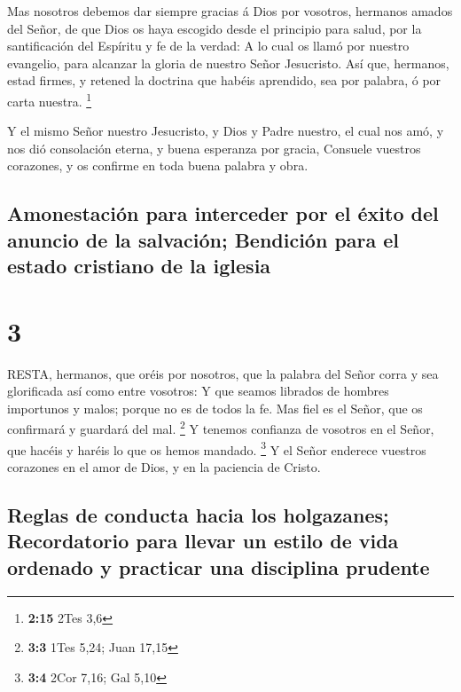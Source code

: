  Mas nosotros debemos dar siempre gracias á Dios por
vosotros, hermanos amados del Señor, de que Dios os haya escogido desde
el principio para salud, por la santificación del Espíritu y fe de la
verdad:  A lo cual os llamó por nuestro evangelio, para
alcanzar la gloria de nuestro Señor Jesucristo.  Así que,
hermanos, estad firmes, y retened la doctrina que habéis aprendido, sea
por palabra, ó por carta nuestra. \footnote{\textbf{2:15} 2Tes 3,6}

 Y el mismo Señor nuestro Jesucristo, y Dios y Padre
nuestro, el cual nos amó, y nos dió consolación eterna, y buena
esperanza por gracia,  Consuele vuestros corazones, y os
confirme en toda buena palabra y obra.

\hypertarget{amonestaciuxf3n-para-interceder-por-el-uxe9xito-del-anuncio-de-la-salvaciuxf3n-bendiciuxf3n-para-el-estado-cristiano-de-la-iglesia}{%
\subsection{Amonestación para interceder por el éxito del anuncio de la
salvación; Bendición para el estado cristiano de la
iglesia}\label{amonestaciuxf3n-para-interceder-por-el-uxe9xito-del-anuncio-de-la-salvaciuxf3n-bendiciuxf3n-para-el-estado-cristiano-de-la-iglesia}}

\hypertarget{section-2}{%
\section{3}\label{section-2}}

 RESTA, hermanos, que oréis por nosotros, que la palabra del
Señor corra y sea glorificada así como entre vosotros:  Y
que seamos librados de hombres importunos y malos; porque no es de todos
la fe.  Mas fiel es el Señor, que os confirmará y guardará
del mal. \footnote{\textbf{3:3} 1Tes 5,24; Juan 17,15}  Y
tenemos confianza de vosotros en el Señor, que hacéis y haréis lo que os
hemos mandado. \footnote{\textbf{3:4} 2Cor 7,16; Gal 5,10} 
Y el Señor enderece vuestros corazones en el amor de Dios, y en la
paciencia de Cristo.

\hypertarget{reglas-de-conducta-hacia-los-holgazanes-recordatorio-para-llevar-un-estilo-de-vida-ordenado-y-practicar-una-disciplina-prudente}{%
\subsection{Reglas de conducta hacia los holgazanes; Recordatorio para
llevar un estilo de vida ordenado y practicar una disciplina
prudente}\label{reglas-de-conducta-hacia-los-holgazanes-recordatorio-para-llevar-un-estilo-de-vida-ordenado-y-practicar-una-disciplina-prudente}}

